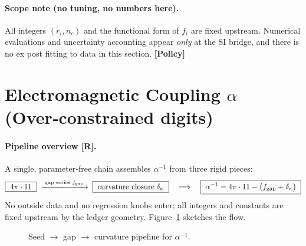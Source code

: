 \documentclass[11pt]{article}
\begin{document}
\paragraph{Scope note (no tuning, no numbers here).} All integers \((r_i,n_c)\) and the functional form of \(f_i\) are fixed upstream. Numerical evaluations and uncertainty accounting appear \emph{only} at the SI bridge, and there is no ex post fitting to data in this section. \textbf{[Policy]}

\section{Electromagnetic Coupling \texorpdfstring{$\alpha$}{alpha} (Over‑constrained digits)}
\label{sec:alpha}

\paragraph{Pipeline overview [R].}
A single, parameter‑free chain assembles $\alpha^{-1}$ from three rigid pieces:
\[
\boxed{~4\pi\cdot 11~}\;\xrightarrow{\;\text{gap series}\;f_{\rm gap}\;}\;
\boxed{~\text{curvature closure}\;\delta_\kappa~}
\quad\Longrightarrow\quad
\boxed{\;\alpha^{-1}=4\pi\cdot 11-\bigl(f_{\rm gap}+\delta_\kappa\bigr)\;}
\]
No outside data and no regression knobs enter; all integers and constants are fixed upstream by the ledger geometry. Figure~\ref{fig:alpha-flow-tikz} sketches the flow.

\begin{figure}[h]
  \centering
  \caption{Seed $\to$ gap $\to$ curvature pipeline for $\alpha^{-1}$.}
  \label{fig:alpha-flow-tikz}
\end{figure}
\end{document}
